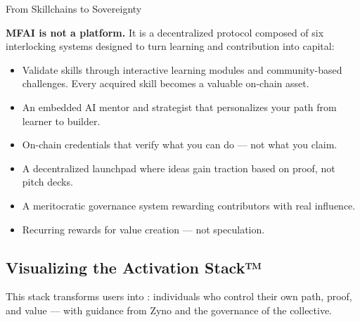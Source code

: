 \begin{mfai-phase}{From Skillchains to Sovereignty}

\textbf{MFAI is not a platform.} It is a decentralized protocol composed of six interlocking systems designed to turn learning and contribution into capital:

\begin{itemize}
  \item {} Validate skills through interactive learning modules and community-based challenges. Every acquired skill becomes a valuable on-chain asset.
  \item {} An embedded AI mentor and strategist that personalizes your path from learner to builder.
  \item {} On-chain credentials that verify what you can do — not what you claim.
  \item {} A decentralized launchpad where ideas gain traction based on proof, not pitch decks.
  \item {} A meritocratic governance system rewarding contributors with real influence.
  \item {} Recurring rewards for value creation — not speculation.
\end{itemize}

\end{mfai-phase}

\vspace{2em}

\subsection*{Visualizing the Activation Stack™}

\begin{center}
\end{center}

\vspace{1em}

\begin{mfai-note}
This stack transforms users into : individuals who control their own path, proof, and value — with guidance from Zyno and the governance of the collective.
\end{mfai-note}
